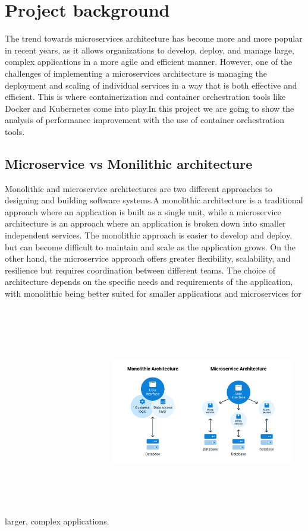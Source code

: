 \section{Project background}
The trend towards microservices architecture has become more and more popular in recent years, as it allows organizations to develop, deploy, and manage large, complex applications in a more agile and efficient manner. However, one of the challenges of implementing a microservices architecture is managing the deployment and scaling of individual services in a way that is both effective and efficient. This is where containerization and container orchestration tools like Docker and Kubernetes come into play.In this project we are going to show the analysis of performance improvement with the use of container orchestration tools.

\subsection{ Microservice vs Monilithic architecture}
Monolithic and microservice architectures are two different approaches to designing and building software systems.A monolithic architecture is a traditional approach where an application is built as a single unit, while a microservice architecture is an approach where an application is broken down into smaller independent services. The monolithic approach is easier to develop and deploy, but can become difficult to maintain and scale as the application grows. On the other hand, the microservice approach offers greater flexibility, scalability, and resilience but requires coordination between different teams. The choice of architecture depends on the specific needs and requirements of the application, with monolithic being better suited for smaller applications and microservices for larger, complex applications.
\includegraphics[width=8cm, height=10cm]{monolith-vs-microservices}

